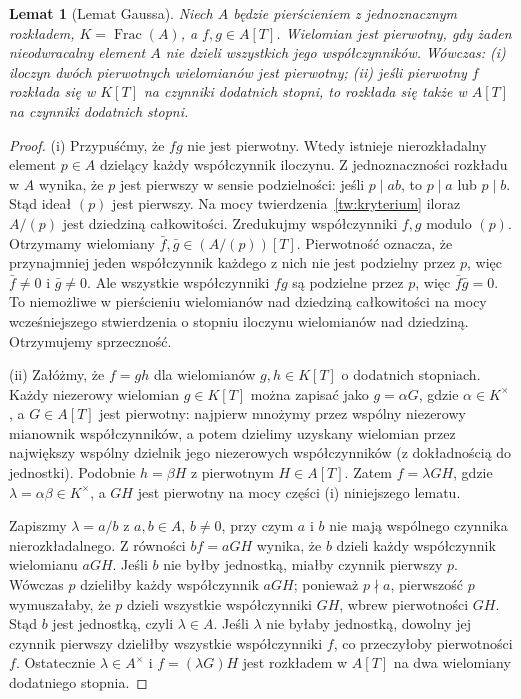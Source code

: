 \documentclass[11pt,a4paper,openany]{report}
\numberwithin{equation}{section}
\theoremstyle{plain}
\newtheorem{lemat}[twierdzenie]{Lemat}
\theoremstyle{definition}
\theoremstyle{remark}
\newcommand{\Frac}{\operatorname{Frac}}
\begin{document}
\begin{lemat}[Lemat Gaussa]
\label{lem:gauss-ufd}
Niech $A$ będzie pierścieniem z jednoznacznym rozkładem,
$K=\Frac(A)$, a $f,g\in A[T]$. Wielomian jest
\emph{pierwotny}, gdy żaden nieodwracalny element $A$
nie dzieli wszystkich jego współczynników.
Wówczas: (i) iloczyn dwóch pierwotnych wielomianów jest
pierwotny; (ii) jeśli pierwotny $f$ rozkłada się
w $K[T]$ na czynniki dodatnich stopni, to rozkłada się
także w $A[T]$ na czynniki dodatnich stopni.
\end{lemat}
\begin{proof}
(i) Przypuśćmy, że $fg$ nie jest pierwotny. Wtedy
istnieje nierozkładalny element $p\in A$ dzielący każdy
współczynnik iloczynu. Z jednoznaczności rozkładu w $A$
wynika, że $p$ jest pierwszy w sensie podzielności:
jeśli $p\mid ab$, to $p\mid a$ lub $p\mid b$.
Stąd ideał $(p)$ jest pierwszy.
Na mocy twierdzenia~\ref{tw:kryterium}
iloraz $A/(p)$ jest dziedziną całkowitości.
Zredukujmy współczynniki $f,g$ modulo $(p)$.
Otrzymamy wielomiany $\bar f,\bar g\in(A/(p))[T]$.
Pierwotność oznacza, że przynajmniej jeden współczynnik
każdego z nich nie jest podzielny przez $p$,
więc $\bar f\ne0$ i $\bar g\ne0$.
Ale wszystkie współczynniki $fg$ są podzielne przez $p$,
więc $\bar f\bar g=0$. To niemożliwe w pierścieniu
wielomianów nad dziedziną całkowitości na mocy
wcześniejszego stwierdzenia o stopniu iloczynu wielomianów
nad dziedziną. Otrzymujemy sprzeczność.

(ii) Załóżmy, że $f=gh$ dla wielomianów
$g,h\in K[T]$ o dodatnich stopniach.
Każdy niezerowy wielomian $g\in K[T]$ można zapisać
jako $g=\alpha G$, gdzie $\alpha\in K^\times$,
a $G\in A[T]$ jest pierwotny: najpierw mnożymy przez
wspólny niezerowy mianownik współczynników, a potem
dzielimy uzyskany wielomian przez największy wspólny dzielnik
jego niezerowych współczynników (z dokładnością do jednostki).
Podobnie $h=\beta H$ z pierwotnym $H\in A[T]$.
Zatem $f=\lambda GH$, gdzie $\lambda=\alpha\beta\in K^\times$,
a $GH$ jest pierwotny na mocy części (i) niniejszego lematu.

Zapiszmy $\lambda=a/b$ z $a,b\in A$, $b\ne0$,
przy czym $a$ i $b$ nie mają wspólnego czynnika nierozkładalnego.
Z równości $bf=aGH$ wynika, że $b$ dzieli każdy
współczynnik wielomianu $aGH$. Jeśli $b$ nie byłby
jednostką, miałby czynnik pierwszy $p$. Wówczas $p$
dzieliłby każdy współczynnik $aGH$; ponieważ $p\nmid a$,
pierwszość $p$ wymuszałaby, że $p$ dzieli wszystkie
współczynniki $GH$, wbrew pierwotności $GH$.
Stąd $b$ jest jednostką, czyli $\lambda\in A$.
Jeśli $\lambda$ nie byłaby jednostką, dowolny jej
czynnik pierwszy dzieliłby wszystkie współczynniki $f$,
co przeczyłoby pierwotności $f$. Ostatecznie
$\lambda\in A^\times$ i $f=(\lambda G)H$ jest rozkładem
w $A[T]$ na dwa wielomiany dodatniego stopnia.
\end{proof}
\end{document}
